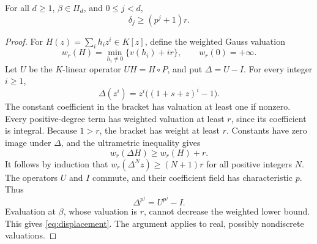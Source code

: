 \begin{lemma}\label{lem:displacement}
For all $d\ge1$, $\beta\in\Pi_d$, and $0\le j<d$,
\begin{equation}\label{eq:displacement}
 \delta_j\ge(p^j+1)r.
\end{equation}
\end{lemma}
\begin{proof}
For $H(z)=\sum_i h_i z^i\in K[z]$, define the weighted Gauss
valuation
\[
 w_r(H)=\min_{h_i\ne0}\{v(h_i)+ir\},\qquad w_r(0)=+\infty.
\]
Let $U$ be the $K$-linear operator $UH=H\circ P$, and put
$\Delta=U-I$. For every integer $i\ge1$,
\[
 \Delta(z^i)=z^i\bigl((1+s+z)^i-1\bigr).
\]
The constant coefficient in the bracket has valuation at least one
if nonzero. Every positive-degree term has weighted valuation at
least $r$, since its coefficient is integral. Because $1>r$, the
bracket has weight at least $r$. Constants have zero image under
$\Delta$, and the ultrametric inequality gives
\begin{equation}\label{eq:delta-weight}
 w_r(\Delta H)\ge w_r(H)+r.
\end{equation}
It follows by induction that $w_r(\Delta^N z)\ge(N+1)r$ for all
positive integers $N$. The operators $U$ and $I$ commute, and their
coefficient field has characteristic $p$. Thus
\[
 \Delta^{p^j}=U^{p^j}-I.
\]
Evaluation at $\beta$, whose valuation is $r$, cannot decrease
the weighted lower bound. This gives \eqref{eq:displacement}.
The argument applies to real, possibly nondiscrete valuations.
\end{proof}
